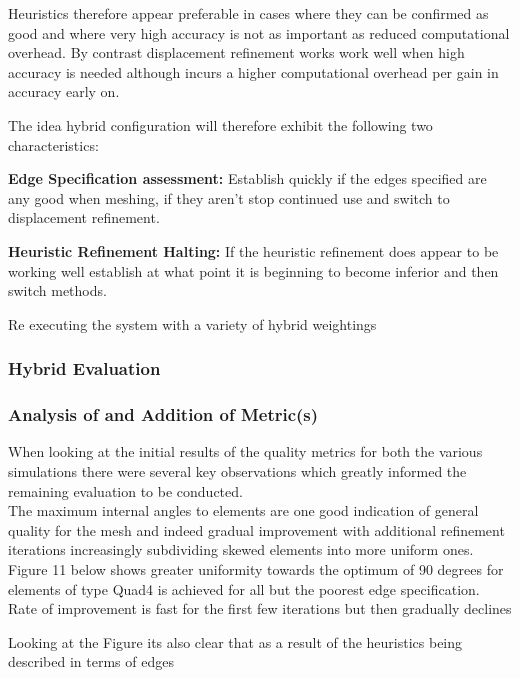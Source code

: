Heuristics therefore appear preferable in cases where they can be confirmed as good and where very high accuracy is not as important as reduced computational overhead. By contrast displacement refinement works work well when high accuracy is needed although incurs a higher computational overhead per gain in accuracy early on.

The idea hybrid configuration will therefore exhibit the following two characteristics:

\textbf{Edge Specification assessment:} Establish quickly if the edges specified are any good when meshing, if they aren't stop continued use and switch to displacement refinement.

\textbf{Heuristic Refinement Halting:} If the heuristic refinement does appear to be working well establish at what point it is beginning to become inferior and then switch methods.


Re executing the system with a variety of hybrid weightings 






\subsubsection{Hybrid Evaluation}


\subsubsection{Analysis of and Addition of Metric(s)}
When looking at the initial results of the quality metrics for both the various simulations there were several key observations which greatly informed the remaining evaluation to be conducted. \\ 

The maximum internal angles to elements are one good indication of general quality for the mesh and indeed gradual improvement with additional refinement iterations increasingly subdividing skewed elements into more uniform ones.
Figure 11 below shows greater uniformity towards the optimum of 90 degrees for elements of type Quad4 is achieved for all but the poorest edge specification. Rate of improvement is fast for the first few iterations but then gradually declines 

Looking at the Figure its also clear that as a result of the heuristics being described in terms of edges

